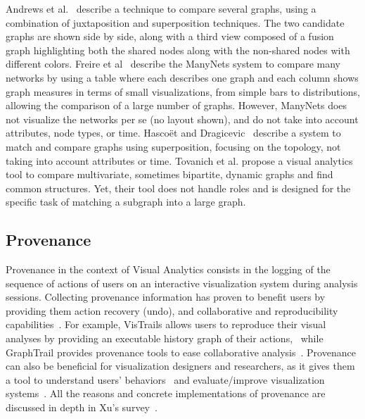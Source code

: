 Andrews et al.~\cite{andrewsVisualGraphComparison2009} describe a technique to compare several graphs, using a combination of juxtaposition and superposition techniques. The two candidate graphs are shown side by side, along with a third view composed of a fusion graph highlighting both the shared nodes along with the non-shared nodes with different colors.
%
Freire et al~\cite{ManyNets} describe the ManyNets system to compare many networks by using a table where each describes one graph and each column shows graph measures in terms of small visualizations, from simple bars to distributions, allowing the comparison of a large number of graphs. However, ManyNets does not visualize the networks per se (no layout shown), and do not take into account attributes, node types, or time.
%
Hascoët and Dragicevic~\cite{HascoetD12} describe a system to match and compare graphs using superposition, focusing on the topology, not taking into account attributes or time.
Tovanich et al.\cite{tovanichVAST2020Contest2021} propose a visual analytics tool to compare multivariate, sometimes bipartite, dynamic graphs and find common structures. Yet, their tool does not handle roles and is designed for the specific task of matching a subgraph into a large graph.

\subsection{Provenance}

Provenance in the context of Visual Analytics consists in the logging of the sequence of actions of users on an interactive visualization system during analysis sessions. Collecting provenance information has proven to benefit users by providing them action recovery (undo), and collaborative and reproducibility capabilities~\cite{raganCharacterizingProvenanceVisualization2016}. For example, VisTrails allows users to reproduce their visual analyses by providing an executable history graph of their actions,~\cite{callahanVisTrailsVisualizationMeets2006} while GraphTrail provides provenance tools to ease collaborative analysis~\cite{dunneGraphTrailAnalyzingLarge2012}.
Provenance can also be beneficial for visualization designers and researchers, as it gives them a tool to understand users' behaviors~\cite{battleCharacterizingExploratoryVisual2019, borsProvenanceTaskAbstraction2019}
and evaluate/improve visualization systems~\cite{renCharticulatorInteractiveConstruction2019}.
All the reasons and concrete implementations of provenance are discussed in depth in Xu's survey~\cite{xuSurveyAnalysisUser2020}.

